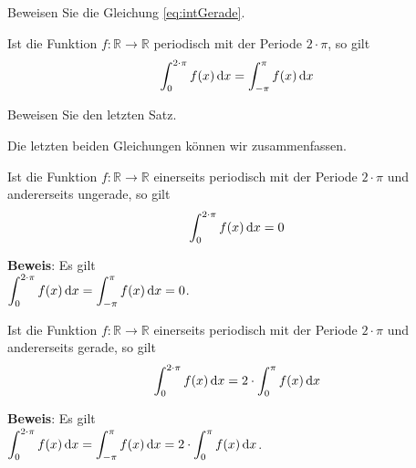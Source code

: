 \exercise
 Beweisen Sie die Gleichung \ref{eq:intGerade}.  \eox

\begin{Satz}
  Ist die Funktion $f:\mathbb{R} \rightarrow \mathbb{R}$ periodisch mit der Periode
  $2\cdot\pi$, so gilt 
  \begin{equation}
    \label{eq:intPeriodic}
    \int_0^{2\cdot\pi}f(x)\,\textrm{d} x = \int_{-\pi}^{\pi}f(x)\,\textrm{d} x
  \end{equation}
\end{Satz}
\vspace*{0.3cm} 

\exercise
Beweisen Sie den letzten Satz.  \eox
\vspace*{0.3cm}

\noindent
Die letzten beiden Gleichungen k\"onnen wir zusammenfassen.
\begin{Korollar}
  Ist die Funktion $f:\mathbb{R} \rightarrow \mathbb{R}$ einerseits periodisch mit der Periode
  $2\cdot\pi$ und andererseits ungerade, so gilt 
  \begin{equation}
    \label{eq:intPeriodicUngerade}
    \int_{0}^{2\cdot\pi} f(x)\, \textrm{d} x = 0
  \end{equation}
\end{Korollar}
\vspace*{0.3cm}

\noindent
\textbf{Beweis}: Es gilt 
\\[0.3cm]
\hspace*{1.3cm}
$\displaystyle \int_{0}^{2\cdot\pi} f(x)\, \textrm{d} x = \int_{-\pi}^{\pi} f(x)\, \textrm{d} x = 0$.

\begin{Korollar}
  Ist die Funktion $f:\mathbb{R} \rightarrow \mathbb{R}$ einerseits periodisch mit der Periode
  $2\cdot\pi$ und andererseits gerade, so gilt 
  \begin{equation}
    \int_{0}^{2\cdot\pi} f(x)\, \textrm{d} x = 2\cdot\int_{0}^{\pi} f(x)\, \textrm{d} x
  \end{equation}
\end{Korollar}
\vspace*{0.3cm}

\noindent
\textbf{Beweis}: Es gilt 
\\[0.3cm]
\hspace*{1.3cm}
$\displaystyle \int_{0}^{2\cdot\pi} f(x)\, \textrm{d} x = \int_{-\pi}^{\pi} f(x)\, \textrm{d} x = 2 \cdot \int_0^{\pi} f(x)\,\textrm{d} x$.

